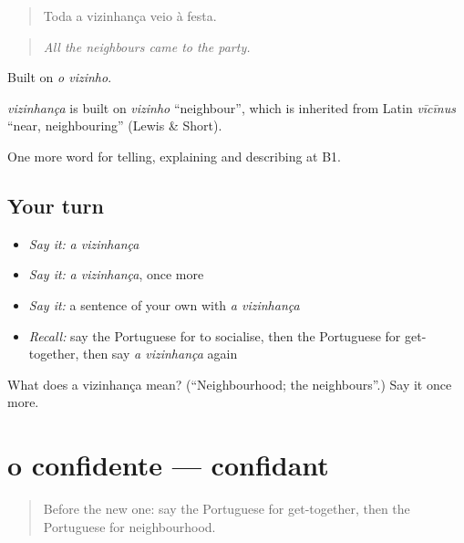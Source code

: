 \begin{quote}
Toda a vizinhança veio à festa.
\end{quote}

\begin{quote}
\emph{All the neighbours came to the party.}
\end{quote}

Built on \emph{o vizinho}.

\begin{cousinweb}
\emph{vizinhança} is built on \emph{vizinho} \textquotedblleft{}neighbour\textquotedblright{}, which is inherited from Latin \emph{vīcīnus} \textquotedblleft{}near, neighbouring\textquotedblright{} (Lewis \& Short).
\end{cousinweb}

\begin{grammarlens}[title={What you've built}]
One more word for telling, explaining and describing at B1.
\end{grammarlens}

\subsection*{Your turn}
\begin{itemize}
\raggedright
  \item \emph{Say it:} \emph{a vizinhança}
  \item \emph{Say it:} \emph{a vizinhança}, once more
  \item \emph{Say it:} a sentence of your own with \emph{a vizinhança}
  \item \emph{Recall:} say the Portuguese for to socialise, then the Portuguese for get-together, then say \emph{a vizinhança} again
\end{itemize}

\begin{tcolorbox}[breakable,colback=teal!4,colframe=teal!35!black,title={Before you move on}]
What does a vizinhança mean? (\textquotedblleft{}Neighbourhood; the neighbours\textquotedblright{}.) Say it once more.
\end{tcolorbox}
\section[o confidente]{o confidente — confidant}

\label{lesson:PT-C498-confidente}



\begin{quote}
Before the new one: say the Portuguese for get-together, then the Portuguese for neighbourhood.
\end{quote}

